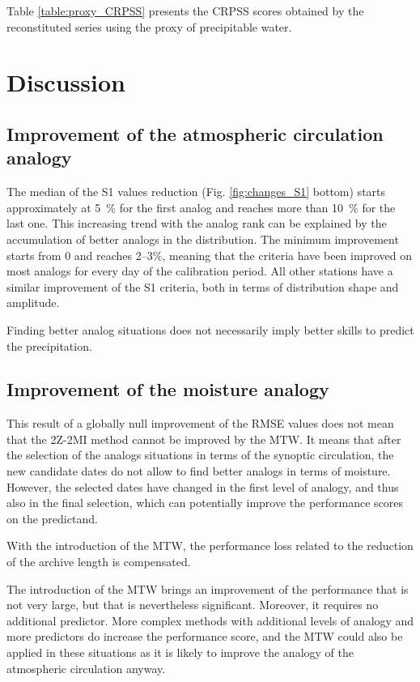 \documentclass[hess, manuscript]{copernicus}
\begin{document}
Table \ref{table:proxy_CRPSS} presents the CRPSS scores obtained by the reconstituted series using the proxy of precipitable water.


\section{Discussion}
\label{sec:discussion}


\subsection{Improvement of the atmospheric circulation analogy}

The median of the S1 values reduction (Fig. \ref{fig:changes_S1} bottom) starts approximately at 5~\% for the first analog and reaches more than 10~\% for the last one. This increasing trend with the analog rank can be explained by the accumulation of better analogs in the distribution. The minimum improvement starts from 0 and reaches 2--3\%, meaning that the criteria have been improved on most analogs for every day of the calibration period. All other stations have a similar improvement of the S1 criteria, both in terms of distribution shape and amplitude.




Finding better analog situations does not necessarily imply better skills to predict the precipitation.


\subsection{Improvement of the moisture analogy}




This result of a globally null improvement of the RMSE values does not mean that the 2Z-2MI method cannot be improved by the MTW. It means that after the selection of the analogs situations in terms of the synoptic circulation, the new candidate dates do not allow to find better analogs in terms of moisture. However, the selected dates have changed in the first level of analogy, and thus also in the final selection, which can potentially improve the performance scores on the predictand.




With the introduction of the MTW, the performance loss related to the reduction of the archive length is compensated.



The introduction of the MTW brings an improvement of the performance that is not very large, but that is nevertheless significant. Moreover, it requires no additional predictor. More complex methods with additional levels of analogy and more predictors do increase the performance score, and the MTW could also be applied in these situations as it is likely to improve the analogy of the atmospheric circulation anyway. 
\end{document}

